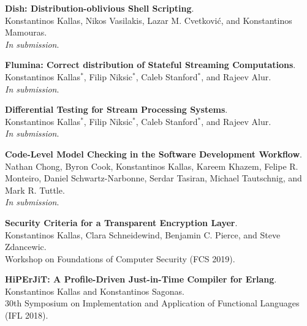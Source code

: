 \begin{minipage}{\textwidth}
\textbf{Dish: Distribution-oblivious Shell Scripting}. \\
Konstantinos Kallas, Nikos Vasilakis, Lazar M. Cvetković, and Konstantinos Mamouras. \\
\emph{In submission}.
\end{minipage}

\begin{minipage}{\textwidth}
\textbf{Flumina: Correct distribution of Stateful Streaming Computations}. \\
Konstantinos Kallas$^*$, Filip Niksic$^*$, Caleb Stanford$^*$, and Rajeev Alur. \\
\emph{In submission}.
\end{minipage}

\begin{minipage}{\textwidth}
\textbf{Differential Testing for Stream Processing Systems}. \\
Konstantinos Kallas$^*$, Filip Niksic$^*$, Caleb Stanford$^*$, and Rajeev Alur. \\
\emph{In submission}.
\end{minipage}

\begin{minipage}{\textwidth}
\textbf{Code-Level Model Checking in the Software Development Workflow}. \\
Nathan Chong, Byron Cook, Konstantinos Kallas, Kareem Khazem, Felipe R. Monteiro, Daniel Schwartz-Narbonne, Serdar Tasiran, Michael Tautschnig, and Mark R. Tuttle. \\
\emph{In submission}.
\end{minipage}

\begin{minipage}{\textwidth}
\textbf{Security Criteria for a Transparent Encryption Layer}. \\
Konstantinos Kallas, Clara Schneidewind, Benjamin C. Pierce, and Steve Zdancewic. \\
Workshop on Foundations of Computer Security (FCS 2019).
\end{minipage}

\begin{minipage}{\textwidth}
\textbf{HiPErJiT: A Profile-Driven Just-in-Time Compiler for Erlang}. \\
Konstantinos Kallas and Konstantinos Sagonas. \\
30th Symposium on Implementation and Application of Functional Languages (IFL 2018).
\end{minipage}



